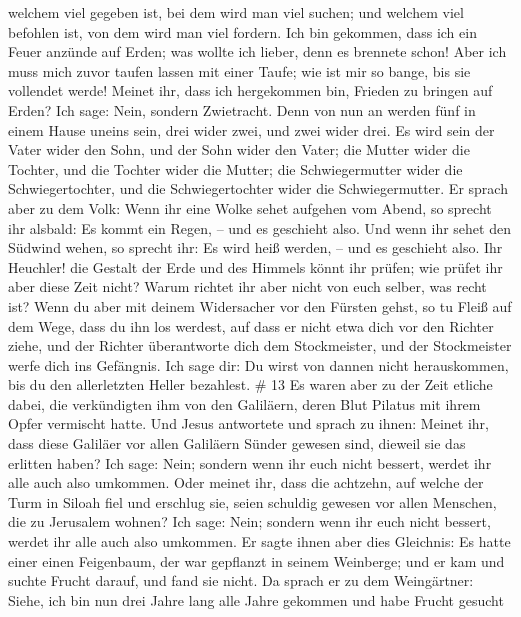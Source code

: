 welchem viel gegeben ist, bei dem wird man viel suchen; und welchem viel
befohlen ist, von dem wird man viel fordern.  Ich bin
gekommen, dass ich ein Feuer anzünde auf Erden; was wollte ich lieber,
denn es brennete schon!  Aber ich muss mich zuvor taufen
lassen mit einer Taufe; wie ist mir so bange, bis sie vollendet werde!
 Meinet ihr, dass ich hergekommen bin, Frieden zu bringen
auf Erden? Ich sage: Nein, sondern Zwietracht.  Denn von
nun an werden fünf in einem Hause uneins sein, drei wider zwei, und zwei
wider drei.  Es wird sein der Vater wider den Sohn, und der
Sohn wider den Vater; die Mutter wider die Tochter, und die Tochter
wider die Mutter; die Schwiegermutter wider die Schwiegertochter, und
die Schwiegertochter wider die Schwiegermutter.  Er sprach
aber zu dem Volk: Wenn ihr eine Wolke sehet aufgehen vom Abend, so
sprecht ihr alsbald: Es kommt ein Regen, -- und es geschieht also.
 Und wenn ihr sehet den Südwind wehen, so sprecht ihr: Es
wird heiß werden, -- und es geschieht also.  Ihr Heuchler!
die Gestalt der Erde und des Himmels könnt ihr prüfen; wie prüfet ihr
aber diese Zeit nicht?  Warum richtet ihr aber nicht von
euch selber, was recht ist?  Wenn du aber mit deinem
Widersacher vor den Fürsten gehst, so tu Fleiß auf dem Wege, dass du ihn
los werdest, auf dass er nicht etwa dich vor den Richter ziehe, und der
Richter überantworte dich dem Stockmeister, und der Stockmeister werfe
dich ins Gefängnis.  Ich sage dir: Du wirst von dannen
nicht herauskommen, bis du den allerletzten Heller bezahlest. \# 13
 Es waren aber zu der Zeit etliche dabei, die verkündigten
ihm von den Galiläern, deren Blut Pilatus mit ihrem Opfer vermischt
hatte.  Und Jesus antwortete und sprach zu ihnen: Meinet
ihr, dass diese Galiläer vor allen Galiläern Sünder gewesen sind,
dieweil sie das erlitten haben?  Ich sage: Nein; sondern
wenn ihr euch nicht bessert, werdet ihr alle auch also umkommen.
 Oder meinet ihr, dass die achtzehn, auf welche der Turm in
Siloah fiel und erschlug sie, seien schuldig gewesen vor allen Menschen,
die zu Jerusalem wohnen?  Ich sage: Nein; sondern wenn ihr
euch nicht bessert, werdet ihr alle auch also umkommen.  Er
sagte ihnen aber dies Gleichnis: Es hatte einer einen Feigenbaum, der
war gepflanzt in seinem Weinberge; und er kam und suchte Frucht darauf,
und fand sie nicht.  Da sprach er zu dem Weingärtner: Siehe,
ich bin nun drei Jahre lang alle Jahre gekommen und habe Frucht gesucht
